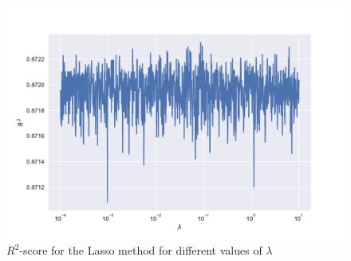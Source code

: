 \documentclass[a4paper,10pt,english]{article}
\begin{document}
\begin{figure}[h!]
	\centering 
	\includegraphics[scale=0.6]{../results/part_e_reg_R2.pdf}
	\caption{$R^2$-score for the Lasso method for different values of $\lambda$}
	\label{part_e_R2}
\end{figure}

\end{document}
